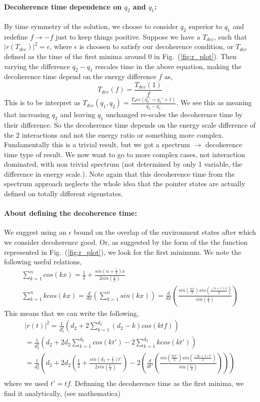 \documentclass{article}
\begin{document}
\paragraph{Decoherence time dependence on $q_2$ and $q_1$:} By time symmetry of the solution, we choose to consider $q_2$ superior to $q_1$ and redefine $f\rightarrow-f$ just to keep things positive.
Suppose we have a $T_{dec}$, such that $|r(T_{dec})|^2=\epsilon$, where $\epsilon$ is choosen to satisfy our decoherence condition, or $T_{dec}$ defined as the time of the first minima around 0 in Fig.~(\ref{fig:r_plot}). Then varying the difference $q_2-q_1$ rescales time in the above equation, making the decoherence time depend on the energy difference $f$ as,
\begin{equation}
    T_{dec}(f)=\frac{T_{dec}(1)}{f}
\end{equation}
This is to be interpret as $T_{dec}(q_1,q_2)=\frac{T_dec(q_2'=q_1'+1)}{q_2-q_1}$. We see this as meaning that increasing $q_2$ and leaving $q_1$ unchanged re-scales the decoherence time by their difference. 
So the decoherence time depends on the energy scale difference of the 2 interactions and not the energy ratio or something more complex. Fundamentally this is a trivial result, but we got a spectrum $\rightarrow$ decoherence time type of result. We now want to go to more complex cases, not interaction dominated, with non trivial spectrum (not determined by only 1 variable, the difference in energy scale.). Note again that this decoherence time from the spectrum approach neglects the whole idea that the pointer states are actually defined on totally different eigenstates.

\paragraph{About defining the decoherence time: }We suggest using an $\epsilon$ bound on the overlap of the environment states after which we consider decoherence good. Or, as suggested by the form of the the function represented in Fig.~(\ref{fig:r_plot}), we look for the first minimum. 
We note the following useful relations,
\begin{align}
    \sum^n_{k=1}cos(kx)=\frac{1}{2}+\frac{sin(n+\frac{1}{2})x}{2sin(\frac{x}{2})}\\ 
    \sum^n_{k=1}kcos(kx)=\frac{d}{dx}(\sum^n_{k=1}sin(kx))=\frac{d}{dx}(\frac{sin(\frac{nx}{2})sin(\frac{(n+1)x}{2})}{sin(\frac{x}{2})})
\end{align}
This means that we can write the following,
\begin{align}
    |r(t)|^2=\frac{1}{d_2^2}(d_2+2\sum^{d_2}_{k=1}(d_2-k)cos(ktf))\\
    =\frac{1}{d_2^2}(d_2+2d_2\sum^{d_2}_{k=1}cos(kt')-2\sum^{d_2}_{k=1}kcos(kt'))\\
    =\frac{1}{d_2^2}(d_2+2d_2(\frac{1}{2}+\frac{sin(d_2+\frac{1}{2})t'}{2sin(\frac{t'}{2})})-2(\frac{d}{dt'}(\frac{sin(\frac{d_2t'}{2})sin(\frac{(d_2+1)t'}{2})}{sin(\frac{t'}{2})})))\\
\end{align}
where we used $t'=tf$. 
Definning the decoherence time as the first minima, we find it analytically, (see mathematica)
\end{document}
